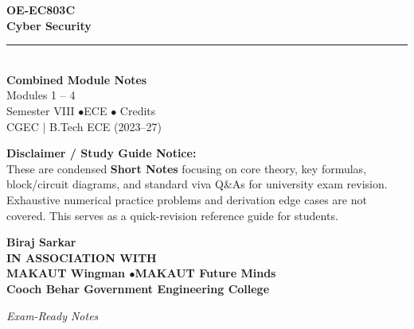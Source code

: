 \documentclass[12pt,a4paper]{article}
\begin{document}
\thispagestyle{empty}


\vspace*{1.0cm}
\begin{center}
  {\Huge\bfseries\color{myred} OE-EC803C}\\[10pt]
  {\LARGE\bfseries\color{mydark} Cyber Security}\\[20pt]
  {\color{myred}\rule{0.7\linewidth}{1.5pt}}\\[18pt]
  {\Large\color{myteal}\textbf{Combined Module Notes}}\\[8pt]
  {\large\color{mydark} Modules 1 -- 4}\\[40pt]
  {\normalsize\color{mydark} Semester VIII \quad$\bullet$\quad ECE \quad$\bullet$ Credits}\\[12pt]
  {\normalsize\color{mydark} CGEC \;$|$\; B.Tech ECE (2023--27)}
\end{center}
\vspace{1.0cm}
\begin{center}
  \begin{tcolorbox}[colback=mygray, colframe=mgframe, boxrule=0.5pt, arc=3pt, width=0.85\linewidth]
    \centering\small\color{mydark}
    \textbf{Disclaimer / Study Guide Notice:}\\
    These are condensed \textbf{Short Notes} focusing on core theory, key formulas, block/circuit diagrams, and standard viva Q\&As for university exam revision. Exhaustive numerical practice problems and derivation edge cases are not covered. This serves as a quick-revision reference guide for students.
  \end{tcolorbox}
\end{center}
\vfill
\vspace{0.6cm}
\begin{center}
  {\large\bfseries\color{mypurple} Biraj Sarkar}\\[16pt]
  {\footnotesize\color{watermark}\textbf{IN ASSOCIATION WITH}}\\[8pt]
  {\small\bfseries\color{mydark} MAKAUT Wingman \quad$\bullet$\quad MAKAUT Future Minds}\\[12pt]
  {\large\bfseries\color{myteal} Cooch Behar Government Engineering College}
\end{center}
\vfill
\begin{center}{\small\color{watermark}\textit{Exam-Ready Notes}}\end{center}
\clearpage
\end{document}

